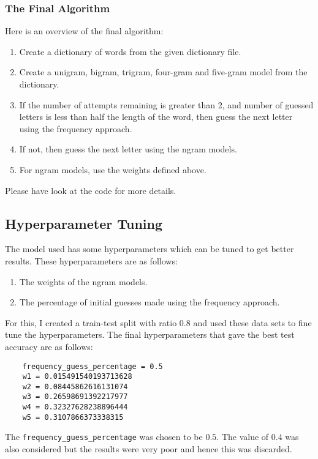 \documentclass[12pt]{article}
\begin{document}
\subsubsection{The Final Algorithm}
Here is an overview of the final algorithm:

\begin{enumerate}
    \item Create a dictionary of words from the given dictionary file.
    \item Create a unigram, bigram, trigram, four-gram and five-gram model from the dictionary.
    \item If the number of attempts remaining is greater than 2, and number of guessed letters is less than half the length of the word, then guess the next letter using the frequency approach.
    \item If not, then guess the next letter using the ngram models.
    \item For ngram models, use the weights defined above.
\end{enumerate}

Please have look at the code for more details.

\subsection{Hyperparameter Tuning}\label{sec:hyperparameter-tuning}

The model used has some hyperparameters which can be tuned to get better results. These hyperparameters are as follows:

\begin{enumerate}
    \item The weights of the ngram models.
    \item The percentage of initial guesses made using the frequency approach.
\end{enumerate}

For this, I created a train-test split with ratio $0.8$ and used these data sets to fine tune the hyperparameters. The final hyperparameters that gave the best test accuracy are as follows:
\begin{verbatim}
    frequency_guess_percentage = 0.5
    w1 = 0.015491540193713628
    w2 = 0.08445862616131074
    w3 = 0.26598691392217977
    w4 = 0.32327628238896444
    w5 = 0.3107866373338315
\end{verbatim}

The \verb|frequency_guess_percentage| was chosen to be $0.5$. The value of $0.4$ was also considered but the results were very poor and hence this was discarded.
\end{document}
